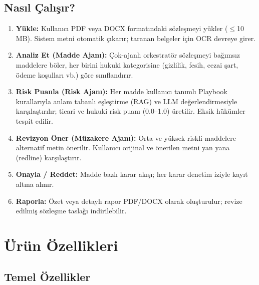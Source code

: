 \documentclass[12pt,a4paper]{article}
\begin{document}
\subsection{Nasıl Çalışır?}

\begin{enumerate}[leftmargin=*, itemsep=6pt]
  \item \textbf{Yükle:} Kullanıcı PDF veya DOCX formatındaki sözleşmeyi yükler ($\leq$10 MB).
  Sistem metni otomatik çıkarır; taranan belgeler için OCR devreye girer.

  \item \textbf{Analiz Et (Madde Ajanı):} Çok-ajanlı orkestratör sözleşmeyi bağımsız maddelere
  böler, her birini hukuki kategorisine (gizlilik, fesih, cezai şart, ödeme koşulları vb.) göre
  sınıflandırır.

  \item \textbf{Risk Puanla (Risk Ajanı):} Her madde kullanıcı tanımlı Playbook kurallarıyla
  anlam tabanlı eşleştirme (RAG) ve LLM değerlendirmesiyle karşılaştırılır; ticari ve hukuki
  risk puanı (0.0–1.0) üretilir. Eksik hükümler tespit edilir.

  \item \textbf{Revizyon Öner (Müzakere Ajanı):} Orta ve yüksek riskli maddelere alternatif
  metin önerilir. Kullanıcı orijinal ve önerilen metni yan yana (redline) karşılaştırır.

  \item \textbf{Onayla / Reddet:} Madde bazlı karar akışı; her karar denetim iziyle kayıt altına
  alınır.

  \item \textbf{Raporla:} Özet veya detaylı rapor PDF/DOCX olarak oluşturulur; revize edilmiş
  sözleşme taslağı indirilebilir.
\end{enumerate}

\section{Ürün Özellikleri}

\subsection{Temel Özellikler}
\end{document}
